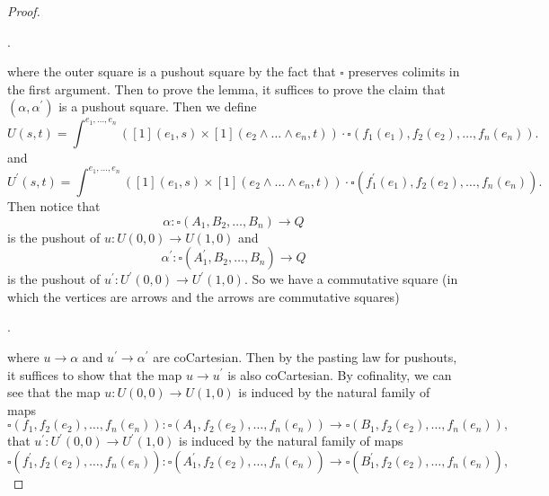 \documentclass[leqno]{article}
\numberwithin{equation}{subsection}
\theoremstyle{plain}   %
\theoremstyle{remark}
\theoremstyle{plain}
\begin{document}
\begin{proof}
\begin{center}
.
	\end{center}
	where the outer square is a pushout square by the fact that \(\square\) preserves colimits in the first argument. Then to prove the lemma, it suffices to prove the claim that \((\alpha,\alpha^\prime)\) is a pushout square.
	Then we define 
	\[
		U(s,t)=\int^{e_1,\dots,e_n} \left([1](e_1,s) \times [1](e_2\wedge\dots\wedge e_n,t)\right)\cdot \square(f_1(e_1),f_2(e_2),\dots, f_n(e_n)).
	\]
	and 
	\[
		U^\prime(s,t)=\int^{e_1,\dots,e_n} \left([1](e_1,s) \times [1](e_2\wedge\dots\wedge e_n,t)\right)\cdot \square(f^\prime_1(e_1),f_2(e_2),\dots, f_n(e_n)).
	\]
	Then notice that 
	\[
		\alpha:\square(A_1,B_2,\dots,B_n) \to Q
	\]
	is the pushout of \(u:U(0,0)\to U(1,0)\) and 
	\[
		\alpha^\prime:\square(A^\prime_1,B_2,\dots,B_n) \to Q
	\]
	is the pushout of \(u^\prime:U^\prime(0,0)\to U^\prime(1,0)\).  So we have a commutative square (in which the vertices are arrows and the arrows are commutative squares)
	\begin{center}
		.
	\end{center}
	 where \(u\to \alpha\) and \(u^\prime\to \alpha^\prime\) are coCartesian.  Then by the pasting law for pushouts, it suffices to show that the map \(u\to u^\prime\) is also coCartesian.  
	By cofinality, we can see that 
	the map \(u: U(0,0) \to U(1,0)\) is induced by the natural family of maps 
	\[
		\square(f_1,f_2(e_2),\dots, f_n(e_n)): \square(A_1,f_2(e_2),\dots, f_n(e_n))\to \square(B_1,f_2(e_2),\dots,f_n(e_n)),
	\]
	that \(u^\prime:U^\prime(0,0)\to U^\prime(1,0)\) is induced by the natural family of maps
	\[\square(f^\prime_1,f_2(e_2),\dots, f_n(e_n)): \square(A^\prime_1,f_2(e_2),\dots, f_n(e_n))\to \square(B^\prime_1,f_2(e_2),\dots,f_n(e_n)),\]

\end{proof}
\end{document}
